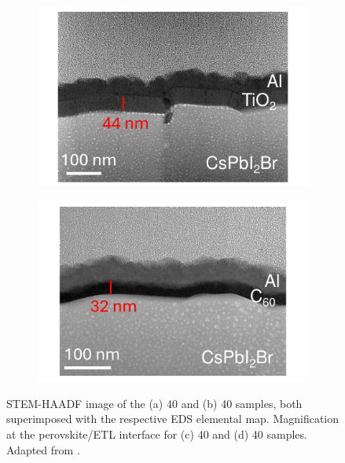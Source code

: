 \begin{figure}[ht!]
\begin{subfigure}[t]{0.45\textwidth}
        \caption{}
        \label{}
    \end{subfigure} 
    \begin{subfigure}[t]{0.45\textwidth}
        \centering
        \includegraphics[width=\textwidth]{chapters/transport_layers/images/SEM_TiO2.pdf} %
        \caption{}
        \label{}
    \end{subfigure}
    \hspace{0.5cm}
    \begin{subfigure}[t]{0.45\textwidth}
        \centering
        \includegraphics[width=\textwidth]{chapters/transport_layers/images/SEM_C60.pdf} %
        \caption{}
        \label{}
    \end{subfigure}
    \caption[STEM-HAADF and EDS elemental map of the 40 and 40 samples.]{STEM-HAADF image of the (a) 40 and (b) 40 samples, both superimposed with the respective EDS elemental map. Magnification at the perovskite/ETL interface for (c) 40 and (d) 40 samples. Adapted from \cite{Papadopoulou2025ElectronSpeed}.}
    \label{fig:etl_optimization:eds_tem_crossection}
\end{figure}


